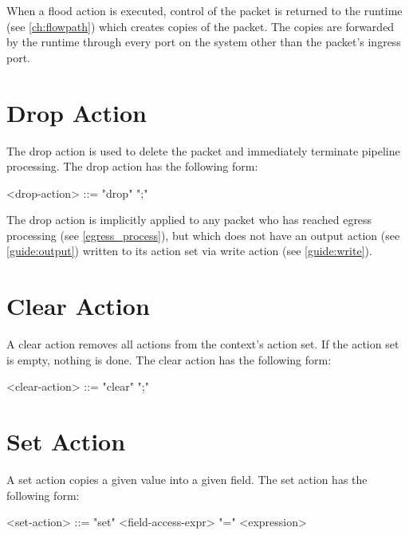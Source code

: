 When a flood action is executed, control of the packet is returned to the runtime (see \ref{ch:flowpath}) which creates copies of the packet. The copies are forwarded by the runtime through every port on the system other than the packet's ingress port.

\section{Drop Action} \label{guide:drop}

The drop action is used to delete the packet and immediately terminate pipeline processing. The drop action has the following form:

\begin{minip}
\begin{grammar}
<drop-action> ::= "drop" ";"
\end{grammar}
\end{minip}

The drop action is implicitly applied to any packet who has reached egress processing (see \ref{egress_process}), but which does not have an output action (see \ref{guide:output}) written to its action set via write action (see \ref{guide:write}).

\section{Clear Action} \label{guide:clear}

A clear action removes all actions from the context's action set. If the action set is empty, nothing is done. The clear action has the following form:

\begin{minip}
\begin{grammar}
<clear-action> ::= "clear" ";"
\end{grammar}
\end{minip}

\section{Set Action} \label{guide:set_field}

A set action copies a given value into a given field. The set action has the following form:

\begin{minip}
\begin{grammar}
<set-action> ::= "set" <field-access-expr> "=" <expression>
\end{grammar}
\end{minip}

